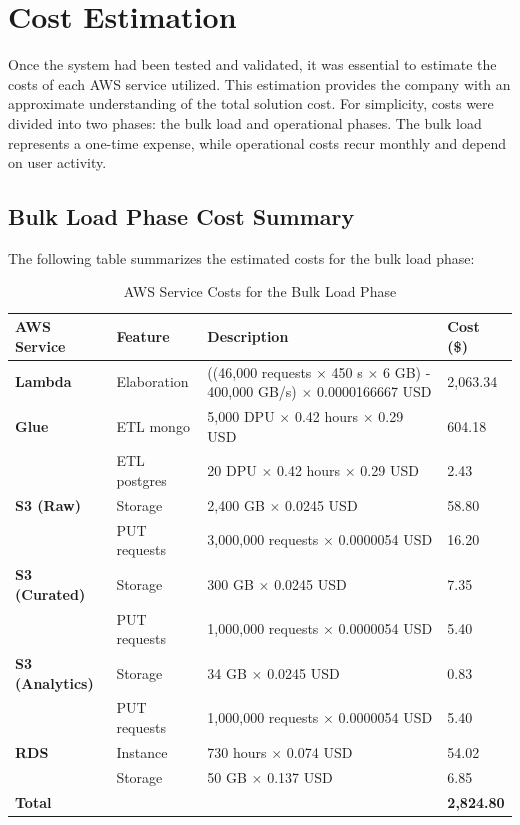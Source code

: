 \section{Cost Estimation}
Once the system had been tested and validated, it was essential to estimate the costs of each \ac{AWS} service utilized. This estimation provides the company with an approximate understanding of the total solution cost. For simplicity, costs were divided into two phases: the bulk load and operational phases. The bulk load represents a one-time expense, while operational costs recur monthly and depend on user activity.

\subsection{Bulk Load Phase Cost Summary}
The following table summarizes the estimated costs for the bulk load phase:

\begin{table}[h]
    \centering
    \begin{tabular}{|p{2.75cm}|p{2.5cm}|p{6.5cm}|p{1.75cm}|}
        \hline
        \textbf{AWS Service} & \textbf{Feature} & \textbf{Description} & \textbf{Cost (\$)} \\ \hline
        \textbf{Lambda} & Elaboration & ((46,000 requests $\times$ 450 s $\times$ 6 GB) - 400,000 GB/s) $\times$ 0.0000166667 USD & 2,063.34 \\ \hline
        \textbf{Glue} & ETL mongo & 5,000 DPU $\times$ 0.42 hours $\times$ 0.29 USD & 604.18 \\ \hline
        & ETL postgres & 20 DPU $\times$ 0.42 hours $\times$ 0.29 USD & 2.43 \\ \hline
        \textbf{S3 (Raw)} & Storage & 2,400 GB $\times$ 0.0245 USD & 58.80 \\ \hline
        & PUT requests & 3,000,000 requests $\times$ 0.0000054 USD & 16.20 \\ \hline
        \textbf{S3 (Curated)} & Storage & 300 GB $\times$ 0.0245 USD & 7.35 \\ \hline
        & PUT requests & 1,000,000 requests $\times$ 0.0000054 USD & 5.40 \\ \hline
        \textbf{S3 (Analytics)} & Storage & 34 GB $\times$ 0.0245 USD & 0.83 \\ \hline
        & PUT requests & 1,000,000 requests $\times$ 0.0000054 USD & 5.40 \\ \hline
        \textbf{RDS} & Instance & 730 hours $\times$ 0.074 USD & 54.02 \\ \hline
        & Storage & 50 GB $\times$ 0.137 USD & 6.85 \\ \hline
        \multicolumn{3}{|l|}{\textbf{Total}} & \textbf{2,824.80} \\ \hline
    \end{tabular}
    \caption{AWS Service Costs for the Bulk Load Phase}
    \label{tab:bulk_load_costs}
\end{table}

